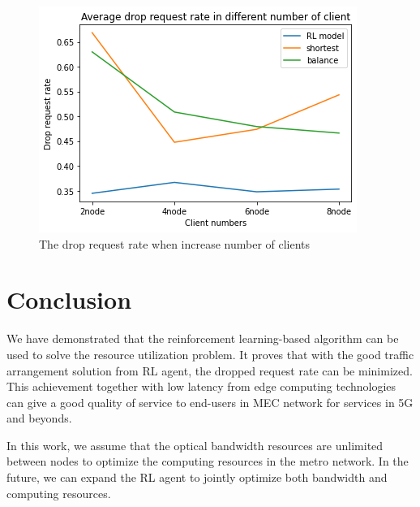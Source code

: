 \documentclass[conference]{IEEEtran}
\begin{document}
\begin{figure}[]
    \centering
    \includegraphics[scale = 0.5]{imgs/increase_ingress_clients.png}
    \caption{The drop request rate when increase number of clients}
    \label{fig:increase_ingress_clients}
\end{figure}



\section{Conclusion}
\label{sec:Conclusion}
We have demonstrated that the reinforcement learning-based algorithm can be used to solve the resource utilization problem. It proves that with the good traffic arrangement solution from RL agent, the dropped request rate can be minimized. This achievement together with low latency from edge computing technologies can give a good quality of service to end-users in MEC network for services in 5G and beyonds.

In this work, we assume that the optical bandwidth resources are unlimited between nodes to optimize the computing resources in the metro network. In the future, we can expand the RL agent to jointly optimize both bandwidth and computing resources.  




\end{document}
